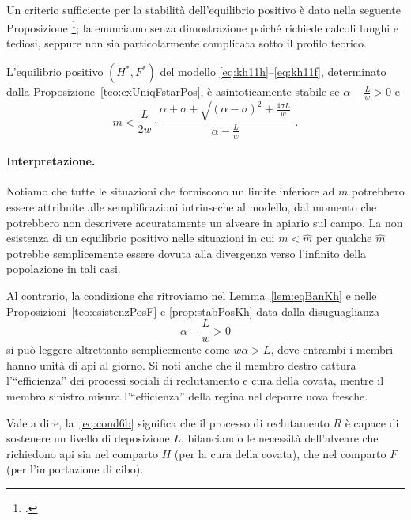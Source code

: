\paragraph{}
Un criterio sufficiente per la stabilità dell'equilibrio positivo è dato nella seguente Proposizione
\footcite[3]{khoury2011}; la enunciamo senza dimostrazione poiché richiede calcoli lunghi e tediosi,
seppure non sia particolarmente complicata sotto il profilo teorico.

\begin{proposizione}
L'equilibrio positivo $(H^*, F^*)$ del modello \eqref{eq:kh11h}--\eqref{eq:kh11f}, determinato
dalla Proposizione~\ref{teo:exUniqFstarPos},
è asintoticamente stabile se $\alpha -\frac{L}{w} >0$ e
$$m < \frac{L}{2w} \cdot \frac{ \alpha + \sigma + \sqrt{ {(\alpha - \sigma)}^2 +\frac{4 \sigma L}{w}  } }
    {\alpha -\frac{L}{w}} \; .$$
    \label{prop:stabPosKh}
\end{proposizione}

\paragraph{Interpretazione.}
\label{par:interpretationCond6b}
Notiamo che tutte le situazioni che forniscono un limite inferiore ad $m$ potrebbero essere attribuite alle
semplificazioni intrinseche al modello, dal momento che potrebbero non descrivere accuratamente un alveare
in apiario sul campo. La non esistenza di un equilibrio positivo nelle situazioni in cui
$m< \hat{m}$ per qualche $\hat{m}$ potrebbe semplicemente essere dovuta alla divergenza verso l'infinito
della popolazione in tali casi.

Al contrario, la condizione che ritroviamo nel Lemma~\ref{lem:eqBanKh} e nelle Proposizioni~\ref{teo:esistenzPosF}
e \ref{prop:stabPosKh} data dalla disuguaglianza
\begin{equation}
\alpha - \frac{L}{w} > 0
    \label{eq:cond6b}
\end{equation}
si può leggere altrettanto semplicemente come $w \alpha >L$, dove entrambi i membri hanno unità di api al giorno.
Si noti anche che il membro destro cattura l'``efficienza'' dei processi sociali di reclutamento e cura della
covata, mentre il membro sinistro misura l'``efficienza'' della regina nel deporre uova fresche.

Vale a dire, la~\eqref{eq:cond6b} significa che il processo di reclutamento $R$ è capace
di sostenere un livello di deposizione $L$, bilanciando le necessità dell'alveare che richiedono api sia nel
comparto $H$ (per la cura della covata), che nel comparto $F$ (per l'importazione di cibo).

